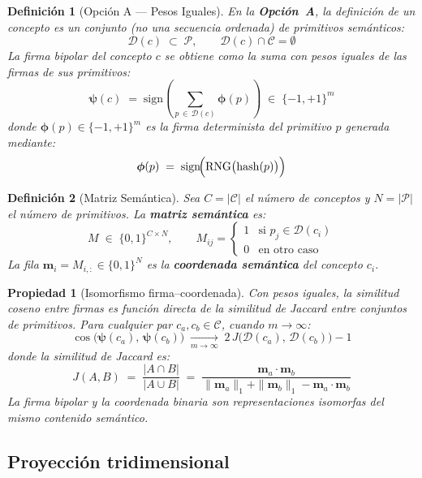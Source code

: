 \documentclass[12pt]{article}
\newtheorem{definition}{Definición}[section]
\newtheorem{property}{Propiedad}[section]
\begin{document}
\begin{definition}[Opción A — Pesos Iguales]
	En la \textbf{Opción~A}, la definición de un concepto es un conjunto (no una
	secuencia ordenada) de primitivos semánticos:
	\[
	\mathcal{D}(c) \;\subset\; \mathcal{P}, \qquad
	\mathcal{D}(c) \cap \mathcal{C} = \emptyset
	\]
	La firma bipolar del concepto $c$ se obtiene como la suma con pesos iguales de
	las firmas de sus primitivos:
	\[
	\bm{\psi}(c) \;=\; \mathrm{sign}\!\left(
	\sum_{p \,\in\, \mathcal{D}(c)} \bm{\phi}(p)
	\right) \;\in\; \{-1,+1\}^m
	\]
	donde $\bm{\phi}(p) \in \{-1,+1\}^m$ es la firma determinista del primitivo $p$
	generada mediante:
	\[
	\bm{\phi}(p) \;=\; \mathrm{sign}\!\Bigl(\mathrm{RNG}\bigl(\mathrm{hash}(p)\bigr)\Bigr)
	\]
\end{definition}

\begin{definition}[Matriz Semántica]
	Sea $C = |\mathcal{C}|$ el número de conceptos y $N = |\mathcal{P}|$ el número
	de primitivos. La \textbf{matriz semántica} es:
	\[
	M \;\in\; \{0,1\}^{C \times N}, \qquad
	M_{ij} =
	\begin{cases}
		1 & \text{si } p_j \in \mathcal{D}(c_i) \\
		0 & \text{en otro caso}
	\end{cases}
	\]
	La fila $\mathbf{m}_i = M_{i,:} \in \{0,1\}^N$ es la \textbf{coordenada semántica}
	del concepto $c_i$.
\end{definition}

\begin{property}[Isomorfismo firma–coordenada]
	Con pesos iguales, la similitud coseno entre firmas es función directa de la
	similitud de Jaccard entre conjuntos de primitivos. Para cualquier par
	$c_a, c_b \in \mathcal{C}$, cuando $m \to \infty$:
	\[
	\cos\!\bigl(\bm{\psi}(c_a),\,\bm{\psi}(c_b)\bigr)
	\;\xrightarrow[m\to\infty]{}\;
	2\,J\!\bigl(\mathcal{D}(c_a),\,\mathcal{D}(c_b)\bigr) - 1
	\]
	donde la similitud de Jaccard es:
	\[
	J(A,B) \;=\; \frac{|A \cap B|}{|A \cup B|}
	\;=\; \frac{\mathbf{m}_a \cdot \mathbf{m}_b}
	{\|\mathbf{m}_a\|_1 + \|\mathbf{m}_b\|_1
		- \mathbf{m}_a \cdot \mathbf{m}_b}
	\]
	La firma bipolar y la coordenada binaria son representaciones isomorfas del
	mismo contenido semántico.
\end{property}

\subsection{Proyección tridimensional}
\end{document}
